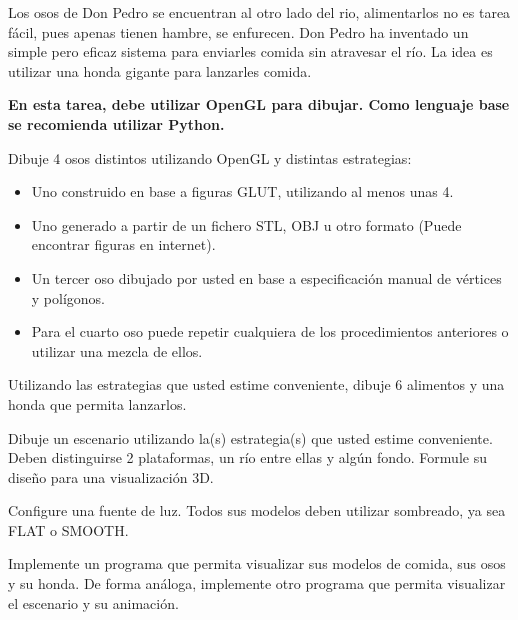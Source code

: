 \documentclass[letterpaper,11pt]{article} %
\begin{document}




Los osos de Don Pedro se encuentran al otro lado del rio, alimentarlos no es tarea fácil, pues apenas tienen hambre, se enfurecen. Don Pedro ha inventado un simple pero eficaz sistema para enviarles comida sin atravesar el río. La idea es utilizar una honda gigante para lanzarles comida. \\


\textbf{En esta tarea, debe utilizar OpenGL para dibujar. Como lenguaje base se recomienda utilizar Python.}


Dibuje 4 osos distintos utilizando OpenGL y distintas estrategias:

\begin{itemize}
	\item Uno construido en base a figuras GLUT, utilizando al menos unas 4.
	\item Uno generado a partir de un fichero STL, OBJ u otro formato (Puede encontrar figuras en internet).
	\item Un tercer oso dibujado por usted en base a especificación manual de vértices y polígonos.
	\item Para el cuarto oso puede repetir cualquiera de los procedimientos anteriores o utilizar una mezcla de ellos.
\end{itemize}

Utilizando las estrategias que usted estime conveniente, dibuje 6 alimentos y una honda que permita lanzarlos.

\newp Dibuje un escenario utilizando la(s) estrategia(s) que usted estime conveniente. Deben distinguirse 2 plataformas, un río entre ellas y algún fondo. Formule su diseño para una visualización 3D.

\newp Configure una fuente de luz. Todos sus modelos deben utilizar sombreado, ya sea FLAT o SMOOTH.

\newp Implemente un programa que permita visualizar sus modelos de comida, sus osos y su honda. De forma análoga, implemente otro programa que permita visualizar el escenario y su animación.

\end{document}
